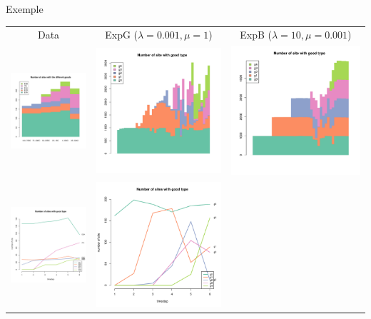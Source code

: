 \documentclass[12pt, notes=show]{beamer}
\begin{document}
\begin{frame}{Exemple}
    \small
    \centering
    \begin{table}
	\begin{tabular}{ccc}
	    Data 	&  ExpG {\tiny ($\lambda=0.001,\mu=1$)} &  ExpB {\tiny ($\lambda=10,\mu=0.001$)}   \\
	    \includegraphics[width=.3\textwidth]{images/hmData.pdf}	&
	    \includegraphics[width=.3\textwidth]{images/hmGoodSimu.pdf}	&
	    \includegraphics[width=.3\textwidth]{images/hmBadSimu.pdf}	\\
	    \includegraphics[width=.3\textwidth]{images/plotData.pdf}	&
	    \includegraphics[width=.3\textwidth]{images/plotGoodSimu.pdf}	&

\end{tabular}
\end{table}
\end{frame}
\end{document}
